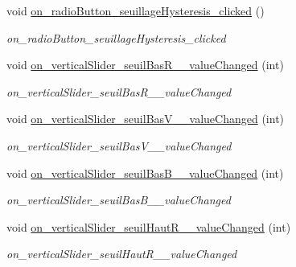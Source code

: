 \begin{DoxyCompactItemize}
\mbox{\label{classAppMainWindow_ac201450dfce689485b0047efe6a73546}} 
void \hyperlink{classAppMainWindow_ac201450dfce689485b0047efe6a73546}{on\+\_\+radio\+Button\+\_\+seuillage\+Hysteresis\+\_\+clicked} ()
\begin{DoxyCompactList}\small\item\em on\+\_\+radio\+Button\+\_\+seuillage\+Hysteresis\+\_\+clicked \end{DoxyCompactList}\item 
\mbox{\label{classAppMainWindow_a3a5d3c2a8d12dd247b784efb98d11cb1}} 
void \hyperlink{classAppMainWindow_a3a5d3c2a8d12dd247b784efb98d11cb1}{on\+\_\+vertical\+Slider\+\_\+seuil\+Bas\+R\+\_\+\_\+value\+Changed} (int)
\begin{DoxyCompactList}\small\item\em on\+\_\+vertical\+Slider\+\_\+seuil\+Bas\+R\+\_\+\_\+value\+Changed \end{DoxyCompactList}\item 
\mbox{\label{classAppMainWindow_a2f5e9d42a0d5f4c716320098091110b1}} 
void \hyperlink{classAppMainWindow_a2f5e9d42a0d5f4c716320098091110b1}{on\+\_\+vertical\+Slider\+\_\+seuil\+Bas\+V\+\_\+\_\+value\+Changed} (int)
\begin{DoxyCompactList}\small\item\em on\+\_\+vertical\+Slider\+\_\+seuil\+Bas\+V\+\_\+\_\+value\+Changed \end{DoxyCompactList}\item 
\mbox{\label{classAppMainWindow_a79462b0c856af1af6321ee51d3461610}} 
void \hyperlink{classAppMainWindow_a79462b0c856af1af6321ee51d3461610}{on\+\_\+vertical\+Slider\+\_\+seuil\+Bas\+B\+\_\+\_\+value\+Changed} (int)
\begin{DoxyCompactList}\small\item\em on\+\_\+vertical\+Slider\+\_\+seuil\+Bas\+B\+\_\+\_\+value\+Changed \end{DoxyCompactList}\item 
\mbox{\label{classAppMainWindow_a2af3d490aa4ea2e233019f0730ac3645}} 
void \hyperlink{classAppMainWindow_a2af3d490aa4ea2e233019f0730ac3645}{on\+\_\+vertical\+Slider\+\_\+seuil\+Haut\+R\+\_\+\_\+value\+Changed} (int)
\begin{DoxyCompactList}\small\item\em on\+\_\+vertical\+Slider\+\_\+seuil\+Haut\+R\+\_\+\_\+value\+Changed \end{DoxyCompactList}\item 

\end{DoxyCompactItemize}
